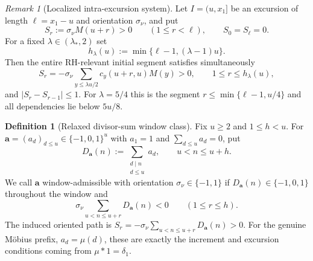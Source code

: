 \documentclass[11pt,reqno]{amsart}
\numberwithin{equation}{section}
\theoremstyle{plain}
\theoremstyle{definition}
\newtheorem{definition}[theorem]{Definition}
\theoremstyle{remark}
\newtheorem{remark}[theorem]{Remark}
\begin{document}
\begin{remark}[Localized intra-excursion system]
\label{rem:sign-cone}
Let $I=(u,x_1]$ be an excursion of length $\ell=x_1-u$ and orientation
$\sigma_\nu$, and put
\begin{equation}
S_r:=\sigma_\nu M(u+r)>0\qquad(1\le r<\ell),\qquad S_0=S_\ell=0.
\end{equation}
For a fixed $\lambda\in(\lambda_*,2)$ set
\begin{equation}
h_\lambda(u):=\min\{\ell-1,(\lambda-1)u\}.
\end{equation}
Then the entire RH-relevant initial segment satisfies simultaneously
\begin{equation}
S_r=-\sigma_\nu\sum_{y\le\lambda u/2}c_y(u+r,u)M(y)>0,
\qquad1\le r\le h_\lambda(u),
\end{equation}
and $|S_r-S_{r-1}|\le1$.  For $\lambda=5/4$ this is the segment
$r\le\min\{\ell-1,u/4\}$ and all dependencies lie below $5u/8$.
\end{remark}

\begin{definition}[Relaxed divisor-sum window class]
\label{def:relaxed-divisor-cone}
Fix $u\ge2$ and $1\le h<u$.  For
$\mathbf a=(a_d)_{d\le u}\in\{-1,0,1\}^u$ with $a_1=1$ and
$\sum_{d\le u}a_d=0$, put
\begin{equation}
D_{\mathbf a}(n):=\sum_{\substack{d\mid n\\ d\le u}}a_d,
\qquad u<n\le u+h.
\end{equation}
We call $\mathbf a$ window-admissible with orientation $\sigma_\nu\in\{-1,1\}$ if
$D_{\mathbf a}(n)\in\{-1,0,1\}$ throughout the window and
\begin{equation}
\sigma_\nu\sum_{u<n\le u+r}D_{\mathbf a}(n)<0
\qquad(1\le r\le h).
\end{equation}
The induced oriented path is
$S_r=-\sigma_\nu\sum_{u<n\le u+r}D_{\mathbf a}(n)>0$.
For the genuine M\"obius prefix, $a_d=\mu(d)$, these are exactly the
increment and excursion conditions coming from $\mu*1=\delta_1$.
\end{definition}
\end{document}

